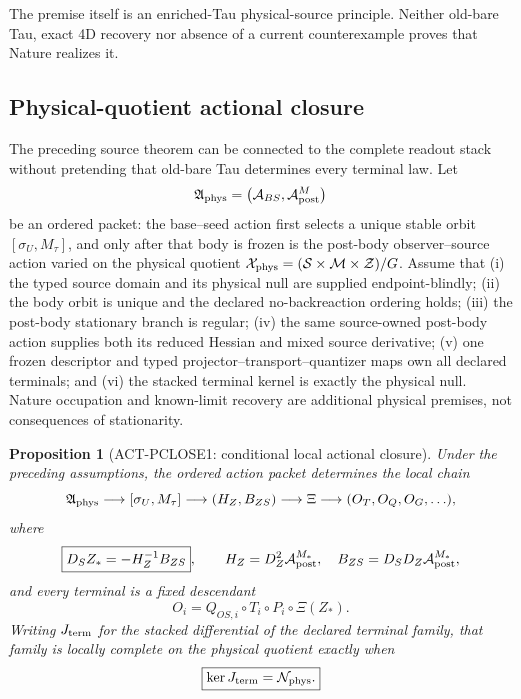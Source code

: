 \documentclass[11pt]{article}
\newtheorem{proposition}{Proposition}
\begin{document}
The premise itself is an enriched-Tau physical-source principle. Neither
old-bare Tau, exact 4D recovery nor absence of a current counterexample proves
that Nature realizes it.

\subsection{Physical-quotient actional closure}

The preceding source theorem can be connected to the complete readout stack
without pretending that old-bare Tau determines every terminal law.  Let
\[
 \mathfrak A_{\rm phys}=
 \bigl(\mathcal A_{BS},\mathcal A_{\rm post}^{M}\bigr)
\]
be an ordered packet: the base--seed action first selects a unique stable
orbit $[\sigma_U,M_\tau]$, and only after that body is frozen is the post-body
observer--source action varied on the physical quotient
$\mathcal X_{\rm phys}=(\mathcal S\times\mathcal M\times\mathcal Z)/G$.
Assume that (i) the typed source domain and its physical null are supplied
endpoint-blindly; (ii) the body orbit is unique and the declared
no-backreaction ordering holds; (iii) the post-body stationary branch is
regular; (iv) the same source-owned post-body action supplies both its reduced
Hessian and mixed source derivative; (v) one frozen descriptor and typed
projector--transport--quantizer maps own all declared terminals; and (vi) the
stacked terminal kernel is exactly the physical null.  Nature occupation and
known-limit recovery are additional physical premises, not consequences of
stationarity.

\begin{proposition}[ACT-PCLOSE1: conditional local actional closure]
\label{prop:act-pclose1}
Under the preceding assumptions, the ordered action packet determines the
local chain
\[
 \mathfrak A_{\rm phys}\longrightarrow[\sigma_U,M_\tau]
 \longrightarrow(H_Z,B_{ZS})\longrightarrow\Xi
 \longrightarrow(O_T,O_Q,O_G,\ldots),
\]
where
\begin{equation}
 \boxed{D_SZ_*=-H_Z^{-1}B_{ZS}},\qquad
 H_Z=D_Z^2\mathcal A_{\rm post}^{M_*},\quad
 B_{ZS}=D_SD_Z\mathcal A_{\rm post}^{M_*},
 \label{eq:act-pclose-response}
\end{equation}
and every terminal is a fixed descendant
\begin{equation}
 O_i=Q_{OS,i}\circ T_i\circ P_i\circ\Xi(Z_*).
 \label{eq:act-pclose-terminal}
\end{equation}
Writing $J_{\rm term}$ for the stacked differential of the declared terminal
family, that family is locally complete on the physical quotient exactly when
\begin{equation}
 \boxed{\ker J_{\rm term}=\mathcal N_{\rm phys}.}
 \label{eq:act-pclose-kernel}
\end{equation}
\end{proposition}
\end{document}
